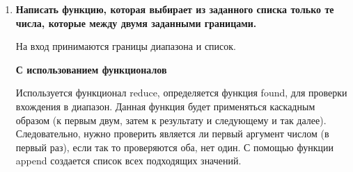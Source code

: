 \documentclass[a4paper,14pt]{extreport} %
\begin{document}
\begin{enumerate}
На вход функции список. 

\textbf{С использованием функционалов}

Используется функционал reduce, определяется функция found, для поиска списка. Данная функция будет применяться каскадным образом (к первым двум, затем к результату и следующему и так далее). Как только находится первый список, немедленно возвращается это значение без проверки остальных. 

\begin{lstlisting}
(defun first_list (lst)
  (defun found (lst1 lst2)
    (or (if (listp lst1) lst1 Nil)
        (if (listp lst2) lst2 Nil)
    )
  )
  (reduce #'found lst)
)
\end{lstlisting}

\textbf{Примеры:}

\begin{lstlisting}
(first_list '(1 (1) (3)))
\end{lstlisting}

Результат: (1)

\textbf{С использованием рекурсии}

Пока список не Nil (каждый раз функция применяется для хвоста списка), ищется список, если список, то он возвращается. 

\begin{lstlisting}
(defun first_list_rec (lst)
  (cond ((null lst) Nil)
        ((if (listp (car lst)) (car lst)))
        (t (first_list_rec (cdr lst)))
  )
)
\end{lstlisting}

\textbf{Примеры:}

\begin{lstlisting}
(first_list_rec '(1 (2 3 4) (3)))
\end{lstlisting}

Результат: (2 3 4)

\item \textbf{Написать функцию, которая выбирает из заданного списка только те числа, которые между двумя заданными границами. }

На вход принимаются границы диапазона и список. 

\textbf{С использованием функционалов}

Используется функционал reduce, определяется функция found, для проверки вхождения в диапазон. Данная функция будет применяться каскадным образом (к первым двум, затем к результату и следующему и так далее). Следовательно, нужно проверить является ли первый аргумент числом (в первый раз), если так то проверяются оба, нет один. С помощью функции append создается список всех подходящих значений. 


\end{enumerate}
\end{document}
